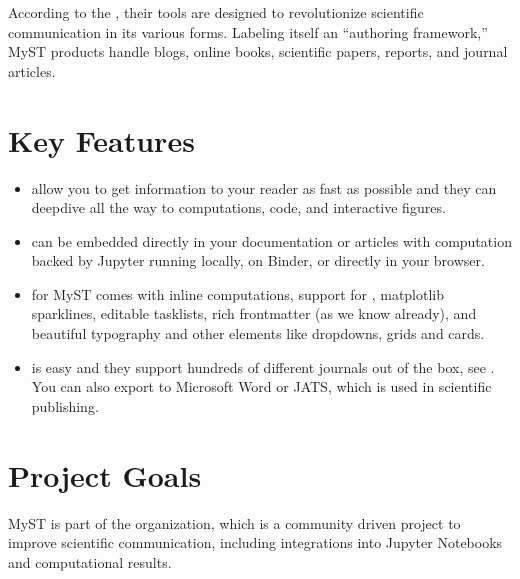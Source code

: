 \documentclass[letterpaper,12pt,english]{sphinxmanual}
\begin{document}
\sphinxAtStartPar
According to the , their tools are designed to revolutionize scientific communication in its various forms. Labeling itself an “authoring framework,” MyST products handle blogs, online books, scientific papers, reports, and journal articles.


\section{Key Features}
\label{\detokenize{notebooks/02-myst.integration:key-features}}\begin{itemize}
\item {} 
\sphinxAtStartPar
{} allow you to get information to your reader as fast as possible and they can deep\sphinxhyphen{}dive all the way to computations, code, and interactive figures.

\item {} 
\sphinxAtStartPar
{} can be embedded directly in your documentation or articles with computation backed by Jupyter \textendash{}running locally, on Binder, or directly in your browser.

\item {} 
\sphinxAtStartPar
{} for MyST comes with inline computations, support for , matplotlib sparklines, editable task\sphinxhyphen{}lists, rich frontmatter (as we know already), and beautiful typography and other elements like dropdowns, grids and cards.

\item {} 
\sphinxAtStartPar
{} is easy and they support hundreds of different journals out of the box, see . You can also export to Microsoft Word or JATS, which is used in scientific publishing.

\end{itemize}


\section{Project Goals}
\label{\detokenize{notebooks/02-myst.integration:project-goals}}
\sphinxAtStartPar
MyST is part of the  organization, which is a community driven project to improve scientific communication, including integrations into Jupyter Notebooks and computational results.
\end{document}
